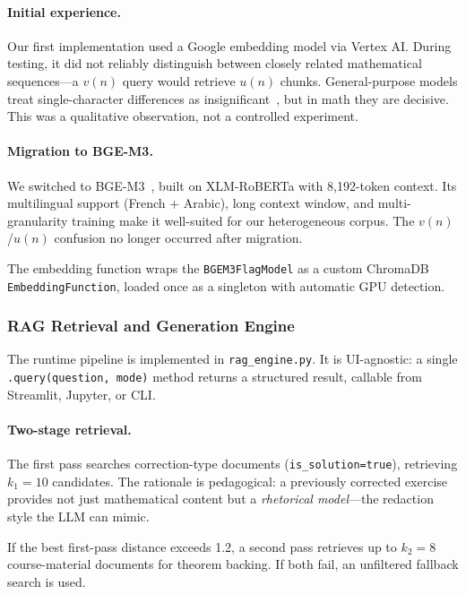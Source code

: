 \paragraph{Initial experience.}
Our first implementation used a Google embedding model via Vertex AI.
During testing, it did not reliably distinguish between closely related
mathematical sequences---a $v(n)$ query would retrieve $u(n)$ chunks.
General-purpose models treat single-character differences as
insignificant~\cite{mansouri2019tangent, pfahler2020math_embeddings},
but in math they are decisive. This was a qualitative observation, not a
controlled experiment.

\paragraph{Migration to BGE-M3.}
We switched to BGE-M3~\cite{chen2024bge_m3}, built on XLM-RoBERTa with
8{,}192-token context. Its multilingual support (French + Arabic), long
context window, and multi-granularity training make it well-suited for our
heterogeneous corpus. The $v(n)$/$u(n)$ confusion no longer occurred after
migration.

The embedding function wraps the \texttt{BGEM3FlagModel} as a custom
ChromaDB \texttt{EmbeddingFunction}, loaded once as a singleton with
automatic GPU detection.


\subsubsection{RAG Retrieval and Generation Engine}
\label{subsec:retrieval-engine}

The runtime pipeline is implemented in \texttt{rag\_engine.py}. It is
UI-agnostic: a single \texttt{.query(question, mode)} method returns a
structured result, callable from Streamlit, Jupyter, or CLI.

\paragraph{Two-stage retrieval.}
The first pass searches correction-type documents
(\texttt{is\_solution=true}), retrieving $k_1 = 10$ candidates. The
rationale is pedagogical: a previously corrected exercise provides not just
mathematical content but a \textit{rhetorical model}---the redaction style
the LLM can mimic.

If the best first-pass distance exceeds 1.2, a second pass retrieves up
to $k_2 = 8$ course-material documents for theorem backing. If both fail,
an unfiltered fallback search is used.

